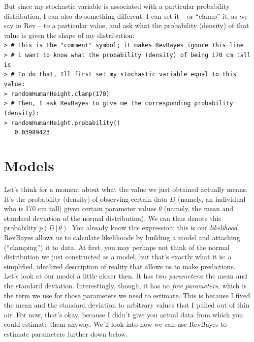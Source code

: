 \documentclass[12pt]{article}
\begin{document}
\newpage

\noindent But since my stochastic variable is associated with a particular probability distribution, I can also do something different: I can set it -- or ``clamp'' it, as we say in Rev -- to a particular value, and ask what the probability (density) of that value is given the shape of my distribution: \\

\indent \texttt{> \# This is the "comment" symbol; it makes RevBayes ignore this line} \\
\indent \texttt{> \# I want to know what the probability (density) of being 170 cm tall is} \\
\indent \texttt{> \# To do that, I\textquotesingle ll first set my stochastic variable equal to this value:} \\
\indent \texttt{> randomHumanHeight.clamp(170)} \\
\indent \texttt{> \# Then, I ask RevBayes to give me the corresponding probability (density):} \\
\indent \texttt{> randomHumanHeight.probability()} \\
\indent \texttt{\ \ \ 0.03989423}

\section*{Models}

\noindent Let's think for a moment about what the value we just obtained actually means. It's the probability (density) of observing certain data $D$ (namely, an individual who is 170 cm tall) given certain parameter values $\theta$ (namely, the mean and standard deviation of the normal distribution). We can thus denote this probability $p(D \, | \, \theta)$. You already know this expression: this is our \textit{likelihood}. RevBayes allows us to calculate likelihoods by building a model and attaching (``clamping'') it to data. At first, you may perhaps not think of the normal distribution we just constructed as a model, but that's exactly what it is: a simplified, idealized description of reality that allows us to make predictions. \\

\noindent Let's look at our model a little closer then. It has two \textit{parameters}: the mean and the standard deviation. Interestingly, though, it has no \textit{free parameters}, which is the term we use for those parameters we need to estimate. This is because I fixed the mean and the standard deviation to arbitrary values that I pulled out of thin air. For now, that's okay, because I didn't give you actual data from which you could estimate them anyway. We'll look into how we can use RevBayes to estimate parameters further down below. \\
\end{document}
